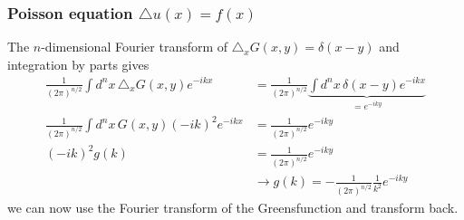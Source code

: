 \documentclass[10pt,a4paper]{book}
\theoremstyle{definition}
\begin{document}
\newpage
\subsubsection{Poisson equation \texorpdfstring{$\triangle u(x) = f(x)$}{TEXT}}
        
The $n$-dimensional Fourier transform of $\triangle_x G(x,y) = \delta(x-y)$ and integration by parts gives
    \begin{align}
        \frac{1}{(2\pi)^{n/2}}\int d^nx\,\triangle_x G(x,y) e^{-ikx}&=\frac{1}{(2\pi)^{n/2}}\underbrace{\int d^nx\,\delta(x-y) e^{-ikx}}_{=e^{-iky}}\\
        \frac{1}{(2\pi)^{n/2}}\int d^nx\, G(x,y) (-ik)^2 e^{-ikx}&=\frac{1}{(2\pi)^{n/2}}e^{-iky}\\
        (-ik)^2g(k)&=\frac{1}{(2\pi)^{n/2}}e^{-iky}\\
        &\rightarrow g(k)=-\frac{1}{(2\pi)^{n/2}}\frac{1}{k^2}e^{-iky}
    \end{align}
    we can now use the Fourier transform of the Greensfunction and transform back.
\end{document}
